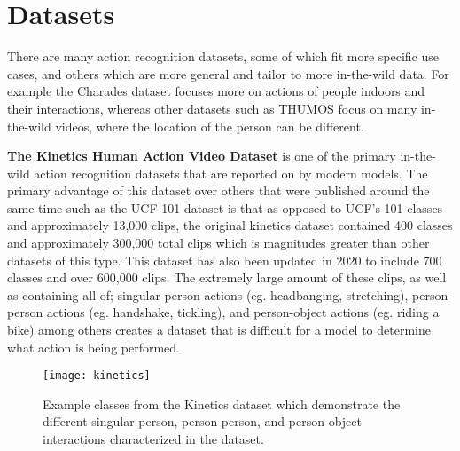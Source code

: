 \section{Datasets}
\label{sec:datasets}

There are many action recognition datasets, some of which fit more specific use cases, and others which are more general and tailor to more in-the-wild data. For example the Charades dataset \cite{charades} focuses more on actions of people indoors and their interactions, whereas other datasets such as THUMOS \cite{THUMOS15} focus on many in-the-wild videos, where the location of the person can be different.

\textbf{The Kinetics Human Action Video Dataset} \cite{kinetics} is one of the primary in-the-wild action recognition datasets that are reported on by modern models. The primary advantage of this dataset over others that were published around the same time such as the UCF-101 dataset \cite{ucf101} is that as opposed to UCF's 101 classes and approximately 13,000 clips, the original kinetics dataset contained 400 classes and approximately 300,000 total clips which is magnitudes greater than other datasets of this type. This dataset has also been updated in 2020 to include 700 classes and over 600,000 clips. The extremely large amount of these clips, as well as containing all of; singular person actions (eg. headbanging, stretching), person-person actions (eg. handshake, tickling), and person-object actions (eg. riding a bike) among others creates a dataset that is difficult for a model to determine what action is being performed.

\begin{figure}[ht]
	\texttt{[image: kinetics]}
	\centering
	\caption{Example classes from the Kinetics dataset \cite{kinetics} which demonstrate the different singular person, person-person, and person-object interactions characterized in the dataset.}
	\label{fig:kinetics}
\end{figure}

